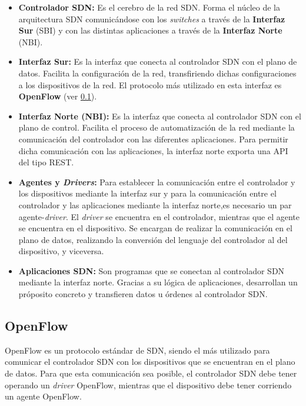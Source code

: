 \begin{itemize}
	\item \textbf{Controlador \ac{SDN}:} Es el cerebro de la red \ac{SDN}. Forma el núcleo de la arquitectura \ac{SDN} comunicándose con los \textit{switches} a través de la \textbf{Interfaz Sur} (\ac{SBI}) y con las distintas aplicaciones a través de la \textbf{Interfaz Norte} (\ac{NBI}).
	
	\item \textbf{Interfaz Sur:} Es la interfaz que conecta al controlador \ac{SDN} con el plano de datos. Facilita la configuración de la red, transfiriendo dichas configuraciones a los dispositivos de la red. El protocolo más utilizado en esta interfaz es \textbf{OpenFlow} (ver \ref{subsec:openflow}).
	
	\item \textbf{Interfaz Norte (\ac{NBI}):} Es la interfaz que conecta al controlador \ac{SDN} con el plano de control. Facilita el proceso de automatización de la red mediante la comunicación del controlador con las diferentes aplicaciones. Para permitir dicha comunicación con las aplicaciones, la interfaz norte exporta una \ac{API} del tipo \ac{REST}.
	
	\item \textbf{Agentes y \textit{Drivers}:} Para establecer la comunicación entre el controlador y los dispositivos mediante la interfaz sur y para la comunicación entre el controlador y las aplicaciones mediante la interfaz norte,es necesario un par agente-\textit{driver}. El \textit{driver} se encuentra en el controlador, mientras que el agente se encuentra en el dispositivo. Se encargan de realizar la comunicación en el plano de datos, realizando la conversión del lenguaje del controlador al del dispositivo, y viceversa.
	
	\item \textbf{Aplicaciones \ac{SDN}:} Son programas que se conectan al controlador \ac{SDN} mediante la interfaz norte. Gracias a su lógica de aplicaciones, desarrollan un próposito concreto y transfieren datos u órdenes al controlador \ac{SDN}.
\end{itemize}


\subsection{OpenFlow}
\label{subsec:openflow}

OpenFlow\cite{openflowbib} es un protocolo estándar de \ac{SDN}, siendo el más utilizado para comunicar el controlador \ac{SDN} con los dispositivos que se encuentran en el plano de datos. Para que esta comunicación sea posible, el controlador \ac{SDN} debe tener operando un \textit{driver} OpenFlow, mientras que el dispositivo debe tener corriendo un agente OpenFlow. 

